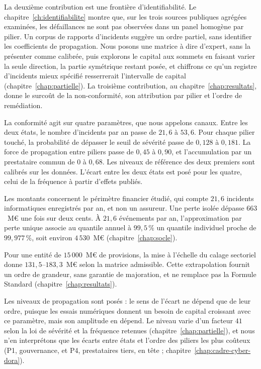La deuxième contribution est une frontière d'identifiabilité. Le
chapitre~\ref{ch:identifiabilite} montre que, sur les trois sources publiques agrégées examinées, les défaillances ne sont pas observées dans un panel homogène par pilier. Un corpus de rapports d'incidents suggère un ordre partiel, sans identifier les coefficients de propagation. Nous posons une matrice à dire d'expert, sans la présenter
comme calibrée, puis explorons le capital aux sommets en faisant varier la seule direction, la partie symétrique restant posée, et chiffrons ce
qu'un registre d'incidents mieux spécifié resserrerait l'intervalle de capital (chapitre~\ref{chap:partielle}). La troisième contribution, au
chapitre~\ref{chap:resultats}, donne le surcoût de la non-conformité, son attribution par pilier et
l'ordre de remédiation.

La conformité agit sur quatre paramètres, que nous appelons canaux. Entre les deux états,
le nombre d'incidents par an passe de $21{,}6$ à $53{,}6$. Pour chaque pilier touché,
la probabilité de dépasser le seuil de sévérité passe de $0{,}128$ à $0{,}181$. La force de propagation entre piliers passe de
$0{,}45$ à $0{,}90$, et l'accumulation par un prestataire commun de $0$ à $0{,}68$. Les niveaux de
référence des deux premiers sont calibrés sur les données. L'écart entre les deux états est posé pour
les quatre, celui de la fréquence à partir d'effets publiés.

Les montants concernent le périmètre financier étudié, qui compte $21{,}6$ incidents informatiques enregistrés par an, et non un assureur.
Une perte isolée dépasse $663$~M\euro{} une fois sur deux cents. À $21{,}6$ événements par an,
l'approximation par perte unique associe au quantile annuel à $99{,}5\,\%$ un quantile individuel proche de $99{,}977\,\%$,
soit environ $4\,530$~M\euro{} (chapitre~\ref{chap:socle}).

Pour une entité de $15\,000$~M\euro{} de provisions, la mise à l'échelle du calage sectoriel donne
$131{,}5$--$183{,}3$~M\euro{} selon la matrice admissible. Cette extrapolation fournit un ordre de grandeur,
sans garantie de majoration, et ne remplace pas la Formule Standard (chapitre~\ref{chap:resultats}).

Les niveaux de propagation sont posés : le sens de l'écart ne dépend que de leur
ordre, puisque les essais numériques donnent un besoin de capital croissant avec ce paramètre, mais son amplitude en dépend. Le niveau
varie d'un facteur $41$ selon la loi de sévérité et la fréquence retenues (chapitre~\ref{chap:partielle}),
et nous n'en interprétons que les écarts entre états et l'ordre des piliers les plus coûteux (P1, gouvernance, et P4, prestataires tiers, en tête ; chapitre~\ref{chap:cadre-cyber-dora}).

